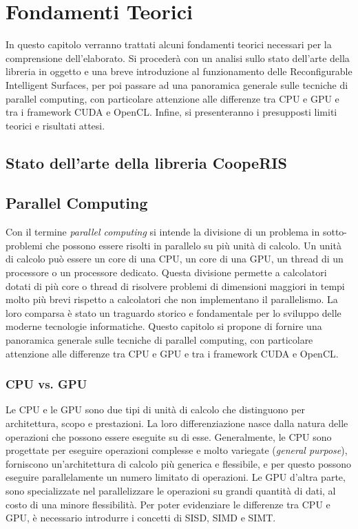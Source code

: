 \chapter{Fondamenti Teorici}
\label{ch:fondamenti}

In questo capitolo verranno trattati alcuni fondamenti teorici necessari per la
comprensione dell'elaborato. Si procederà con un analisi sullo stato dell'arte della
libreria in oggetto e una breve introduzione al funzionamento delle Reconfigurable
Intelligent Surfaces, per poi passare ad una panoramica generale sulle tecniche
di parallel computing, con particolare attenzione alle differenze tra CPU e GPU e
tra i framework CUDA e OpenCL. Infine, si presenteranno i presupposti limiti teorici
e risultati attesi.

\section{Stato dell'arte della libreria CoopeRIS}
\label{sec:statodellarte}

\lipsum[1]

\section{Parallel Computing}
\label{sec:parallelcomputing}

Con il termine \textit{parallel computing} si intende la divisione di un
problema in sotto-problemi che possono essere risolti in parallelo su più unità
di calcolo. Un unità di calcolo può essere un core di una CPU, un core di una
GPU, un thread di un processore o un processore dedicato. Questa divisione
permette a calcolatori dotati di più core o thread di risolvere problemi di
dimensioni maggiori in tempi molto più brevi rispetto a calcolatori che non
implementano il parallelismo. La loro comparsa è stato un traguardo storico e fondamentale
per lo sviluppo delle moderne tecnologie informatiche. Questo capitolo si
propone di fornire una panoramica generale sulle tecniche di parallel computing,
con particolare attenzione alle differenze tra CPU e GPU e tra i framework CUDA e
OpenCL.

\subsection{CPU vs. GPU}
\label{subsec:cpuvsgpu}

Le CPU e le GPU sono due tipi di unità di calcolo che distinguono per
architettura, scopo e prestazioni. La loro differenziazione nasce dalla natura
delle operazioni che possono essere eseguite su di esse. Generalmente, le CPU
sono progettate per eseguire operazioni complesse e molto variegate (\textit{general
purpose}), forniscono un'architettura di calcolo più generica e flessibile, e per
questo possono eseguire parallelamente un numero limitato di operazioni. Le GPU
d'altra parte, sono specializzate nel parallelizzare le operazioni su grandi quantità
di dati, al costo di una minore flessibilità. Per poter evidenziare le differenze
tra CPU e GPU, è necessario introdurre i concetti di SISD, SIMD e SIMT.

